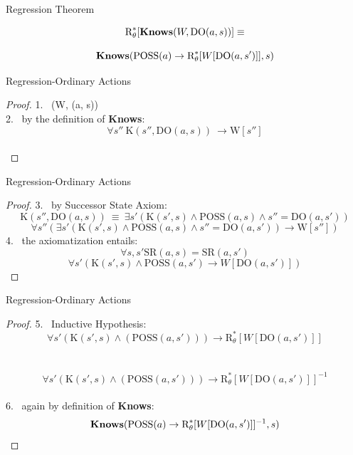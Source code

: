 \begin{frame}{Regression Theorem}
    \begin{theorem}
        \[ \text{R}^*_{\theta}[\textbf{Knows}(W, \text{DO}(a, s))] \equiv \]
            
        \[ \textbf{Knows}(\text{POSS}(a) \rightarrow \text{R}^*_{\theta}[W[\text{DO}(a, s')]], s) \]
    \end{theorem}    
\end{frame}

\begin{frame}{Regression-Ordinary Actions}
    \begin{proof}  
       1. \ \knows(W, (a, s)) \\
       2. \ by the definition of \textbf{Knows}: \ \[ \forall s'' \  \text{K}(s'', \text{DO}(a, s)) \ \rightarrow \text{W}[s''] \] \\
    \end{proof} 
\end{frame} 

\begin{frame}{Regression-Ordinary Actions}
    \begin{proof}  
       3. \ by Successor State Axiom: \[ \text{K}(s'', \text{DO}(a, s)) \ \equiv \ \exists s'(\text{K}(s',s) \land \text{POSS}(a, s) \land s'' = \text{DO}(a, s'))\]
          \[ \forall s''(\exists s'(\text{K}(s',s) \land \text{POSS}(a, s) \land s'' = \text{DO}(a, s')) \rightarrow \text{W}[s''])  \]
       4. \ the axiomatization entails: \[ \forall s,s' \text{SR}(a, s) = \text{SR}(a, s') \] 
          \[ \forall s'(\text{K}(s',s) \land \text{POSS}(a, s') \rightarrow W[\text{DO}(a, s')]) \]
    \end{proof}
\end{frame}

\begin{frame}{Regression-Ordinary Actions}

    \begin{proof}  
       5. \ Inductive Hypothesis: \[ \forall s'(\text{K}(s',s) \land (\text{POSS}(a, s'))) \rightarrow \text{R}^*_{\theta}[W[\text{DO}(a, s')]] \] \\
          \ \[ \forall s'(\text{K}(s',s) \land (\text{POSS}(a, s'))) \rightarrow \text{R}^*_{\theta}[W[\text{DO}(a, s')]]^{-1} \] \\
       
       6. \ again by definition of \textbf{Knows}: \  \[ \textbf{Knows}(\text{POSS}(a) \rightarrow \text{R}^*_{\theta}[W[\text{DO}(a, s')]]^{-1}, s) \]
    \end{proof} 

\end{frame}


